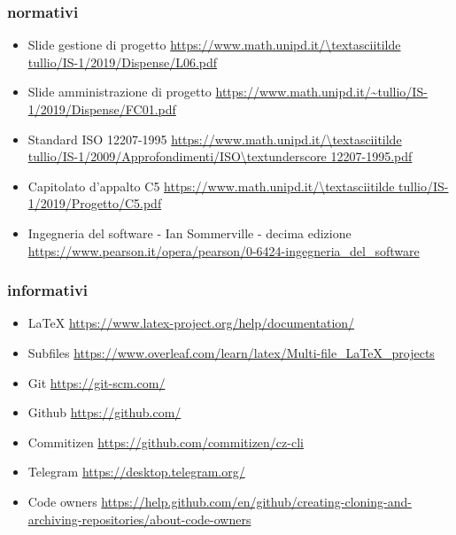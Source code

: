\documentclass[../norme-di-progetto.tex]{subfiles}
\begin{document}
\subsubsection{normativi}
\label{subs:normativi}
\begin{itemize}
	\item Slide gestione di progetto 
	\newline \url{https://www.math.unipd.it/\textasciitilde tullio/IS-1/2019/Dispense/L06.pdf}
	\item Slide amministrazione di progetto
	\newline \url{https://www.math.unipd.it/~tullio/IS-1/2019/Dispense/FC01.pdf}
	\item Standard ISO 12207-1995 
	\newline \url{https://www.math.unipd.it/\textasciitilde tullio/IS-1/2009/Approfondimenti/ISO\textunderscore 12207-1995.pdf}
	\item Capitolato d'appalto C5 
	\newline \url{https://www.math.unipd.it/\textasciitilde tullio/IS-1/2019/Progetto/C5.pdf}
	\item Ingegneria del software - Ian Sommerville - decima edizione
	\newline \url{https://www.pearson.it/opera/pearson/0-6424-ingegneria_del_software}
\end{itemize}
\subsubsection{informativi}
\label{subs:riferimenti informativi}
\begin{itemize}
	\item \LaTeX
	\newline \url{https://www.latex-project.org/help/documentation/}
	\item Subfiles
	\newline \url{https://www.overleaf.com/learn/latex/Multi-file_LaTeX_projects}
	\item Git
	\newline \url{https://git-scm.com/}
	\item Github
	\newline \url{https://github.com/}
	\item Commitizen
	\newline \url{https://github.com/commitizen/cz-cli}
	\item Telegram
	\newline \url{https://desktop.telegram.org/}
	\item Code owners
	\newline \url{https://help.github.com/en/github/creating-cloning-and-archiving-repositories/about-code-owners}
\end{itemize}
\end{document}
